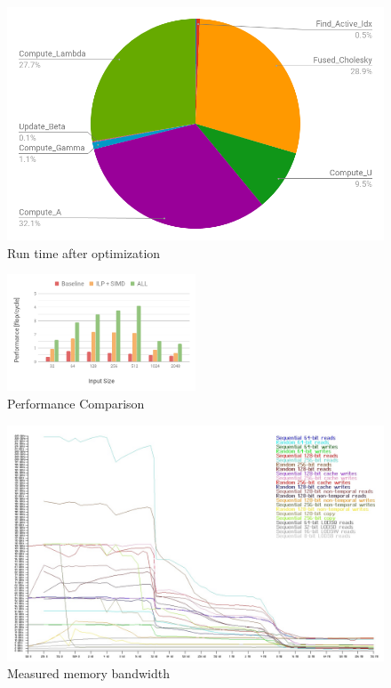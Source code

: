 \begin{figure}
\centering
  \includegraphics[scale=0.26]{./pic/pie_after.png}
  \caption{Run time after optimization}
  \label{fig:pie_after}
\end{figure}

\begin{figure}[h]
\centering
\includegraphics[width=0.5\textwidth]{./pic/performance.png}
\caption{Performance Comparison}
\label{fig:performance}
\end{figure}


\begin{figure}
\centering
\includegraphics[scale=0.28]{./pic/bandwidth.jpg}
\caption{Measured memory bandwidth}
\label{fig:mem-bw}
\end{figure}

